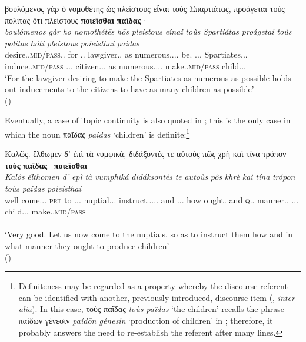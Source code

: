\documentclass[output=paper,colorlinks,citecolor=brown]{langscibook}
\begin{document}
\ea \label{ex:10}
\glll βουλόμενος 			γὰρ 	ὁ 		νομοθέτης ὡς 	πλείστους 			εἶναι 	τοὺς 		Σπαρτιάτας, προάγεται 			τοὺς         	πολίτας	ὅτι 	 πλείστους \textbf{ποιεῖσθαι} 		\textbf{παῖδας}·\\
\textit{boulómenos}			\textit{gàr}	\textit{ho}		\textit{nomothétēs} \textit{hōs}	\textit{pleístous}			\textit{eînai}	\textit{toùs}		\textit{Spartiátas}  \textit{proágetai}			\textit{toùs}	         	\textit{polítas}		\textit{hóti}	 \textit{pleístous} \textit{poieîsthai} 		\textit{paîdas}\\
desire.\Ptcp{}.\textsc{mid/pass}.\Nom{}.\M{} for \Art{}.\Nom{}.\M{} lawgiver.\Nom{}.\M{} as numerous.\Sup{}.\Acc{}.\M{}.\Pl{} be.\Inf{} \Art{}.\Acc{}.\M{}.\Pl{} Spartiates.\Acc{}.\M{}.\Pl{} induce.\Tsg{}.\textsc{mid/pass} \Art{}.\Acc{}.\M{}.\Pl{} citizen.\Acc{}.\M{}.\Pl{} as numerous.\Sup{}.\Acc{}.\M{}.\Pl{} make.\Inf{}.\textsc{mid/pass} child.\Acc{}.\M{}.\Pl{}\\
\glt `For the lawgiver desiring to make the Spartiates as numerous as possible holds out inducements to the citizens to have as many children as possible' \\
\hspace*{\fill}()
\z

Eventually, a case of Topic continuity is also quoted in ; this is the only case in which the noun παῖδας \textit{paîdas} `children' is definite:\footnote{Definiteness may be regarded as a property whereby the discourse referent can be identified with another, previously introduced, discourse item (\citealt[44--45]{vonHeusinger2003}, \textit{inter alia}). In this case, τοὺς παῖδας \textit{toùs paîdas} `the children' recalls the phrase παίδων γένεσιν \textit{paídōn génesin} `production of children' in ; therefore, it probably answers the need to re-establish the referent after many lines. }

\ea \label{ex:11}
\glll Καλῶς. 	ἔλθωμεν 		δ’ 	ἐπὶ 	τὰ 		νυμφικά, διδάξοντές 			τε 	αὐτοὺς 	πῶς 	χρὴ καὶ 	τίνα		τρόπον		\textbf{τοὺς}		\textbf{παῖδας} 	\textbf{ποιεῖσθαι} \\
\textit{Kalôs}		\textit{élthōmen}		\textit{d’}	\textit{epì}	\textit{tà}		\textit{vumphiká} \textit{didáksontés}			\textit{te}	\textit{autoùs}		\textit{pôs}	\textit{khrḕ} \textit{kaì}	\textit{tína}		\textit{trópon}		\textit{toùs}		\textit{paîdas} 		\textit{poieîsthai}\\
well come.\Aor{}.\Sbjv{}.\Fpl{} \textsc{prt} to \Art{}.\Acc{}.\N{}.\Pl{} nuptial.\Acc{}.\N{}.\Pl{} instruct.\Fut{}.\Ptcp{}.\Nom{}.\M{}.\Pl{} and \Dem{}.\Acc{}.\M{}.\Pl{} how ought.\Tsg{} and \textsc{q}.\Acc{}.\M{} manner.\Acc{}.\M{} \Art{}.\Acc{}.\M{}.\Pl{} child.\Acc{}.\M{}.\Pl{} make.\Inf{}.\textsc{mid/pass}\\
\\
\glt `Very good. Let us now come to the nuptials, so as to instruct them how and in what manner they ought to produce children' \\
\hspace*{\fill}()
\z
\end{document}
